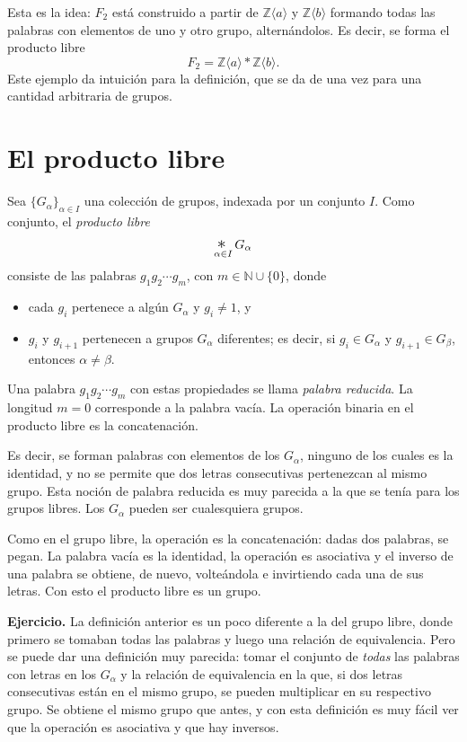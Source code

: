 \documentclass[11pt]{article}
\begin{document}
Esta es la idea: $F_2$ está construido a partir de $\mathbb{Z}\langle a\rangle$ y $\mathbb{Z}\langle b\rangle$ formando todas las palabras con elementos de uno y otro grupo, alternándolos. Es decir, se forma el producto libre
\[
  F_2=\mathbb{Z}\langle a\rangle*\mathbb{Z}\langle b\rangle.
\]
Este ejemplo da intuición para la definición, que se da de una vez para una cantidad arbitraria de grupos.

\section*{El producto libre}

\begin{defn}\label{defn:producto-libre}
Sea $\{G_\alpha\}_{\alpha\in I}$ una colección de grupos, indexada por un conjunto $I$. Como conjunto, el \emph{producto libre}
\[
  \mathop{\scalebox{1.4}{$*$}}_{\alpha\in I}G_\alpha
\]
consiste de las palabras $g_1g_2\cdots g_m$, con $m\in\mathbb{N}\cup\{0\}$, donde
\begin{itemize}
  \item cada $g_i$ pertenece a algún $G_\alpha$ y $g_i\neq1$, y
  \item $g_i$ y $g_{i+1}$ pertenecen a grupos $G_\alpha$ diferentes; es decir, si $g_i\in G_\alpha$ y $g_{i+1}\in G_\beta$, entonces $\alpha\neq\beta$.
\end{itemize}
Una palabra $g_1g_2\cdots g_m$ con estas propiedades se llama \emph{palabra reducida}. La longitud $m=0$ corresponde a la palabra vacía. La operación binaria en el producto libre es la concatenación.
\end{defn}

Es decir, se forman palabras con elementos de los $G_\alpha$, ninguno de los cuales es la identidad, y no se permite que dos letras consecutivas pertenezcan al mismo grupo. Esta noción de palabra reducida es muy parecida a la que se tenía para los grupos libres. Los $G_\alpha$ pueden ser cualesquiera grupos.

Como en el grupo libre, la operación es la concatenación: dadas dos palabras, se pegan. La palabra vacía es la identidad, la operación es asociativa y el inverso de una palabra se obtiene, de nuevo, volteándola e invirtiendo cada una de sus letras. Con esto el producto libre es un grupo.

\medskip\noindent\textbf{Ejercicio.} La definición anterior es un poco diferente a la del grupo libre, donde primero se tomaban todas las palabras y luego una relación de equivalencia. Pero se puede dar una definición muy parecida: tomar el conjunto de \emph{todas} las palabras con letras en los $G_\alpha$ y la relación de equivalencia en la que, si dos letras consecutivas están en el mismo grupo, se pueden multiplicar en su respectivo grupo. Se obtiene el mismo grupo que antes, y con esta definición es muy fácil ver que la operación es asociativa y que hay inversos.
\end{document}
